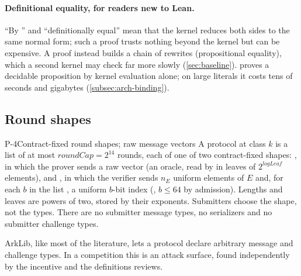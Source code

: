 \paragraph{Definitional equality, for readers new to Lean.} \enquote{By } and
\enquote{definitionally equal} mean that the kernel reduces both sides to the same normal form; such a
proof trusts nothing beyond the kernel but can be expensive. A  proof instead builds a
chain of rewrites (propositional equality), which a second kernel may check far more slowly
(\cref{sec:baseline}).  proves a decidable proposition by kernel evaluation
alone; on large literals it costs tens of seconds and gigabytes (\cref{subsec:arch-binding}).

\subsection{Round shapes}\label{subsec:proto-rounds}

\begin{decision}{P-4}{Contract-fixed round shapes; raw message vectors}
A protocol at class $k$ is a list of at most $\mathit{roundCap}=2^{14}$ rounds, each of one of two
contract-fixed shapes: , in which the prover sends a raw vector
 (an oracle, read by  in leaves of $2^{\mathit{logLeaf}}$
elements), and , in which the verifier sends $n_E$ uniform elements of $E$ and,
for each $b$ in the list , a uniform $b$-bit index (, $b\le 64$ by
admission). Lengths and leaves are powers of two, stored by their exponents. Submitters choose the
shape, not the types. There are no submitter message types, no serializers and no submitter
challenge types.
\end{decision}

\noindent ArkLib, like most of the literature, lets a protocol declare arbitrary message and
challenge types. In a competition this is an attack surface, found independently by the incentive
and the definitions reviews.


